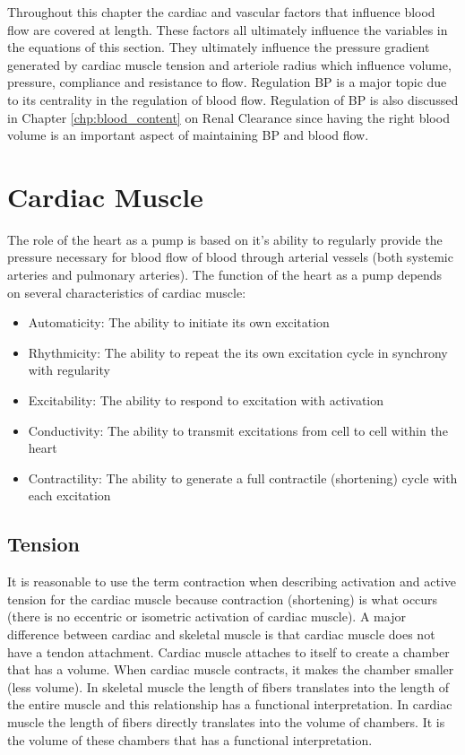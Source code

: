 Throughout this chapter the cardiac and vascular factors that influence blood flow are covered at length. These factors all ultimately influence the variables in the equations of this section. They ultimately influence the pressure gradient generated by cardiac muscle tension and arteriole radius which influence volume, pressure, compliance and resistance to flow. Regulation BP is a major topic due to its centrality in the regulation of blood flow. Regulation of BP is also discussed in Chapter \ref{chp:blood_content} on Renal Clearance since having the right blood volume is an important aspect of maintaining BP and blood flow.

\section{Cardiac Muscle}

The role of the heart as a pump is based on it's ability to regularly provide the pressure necessary for blood flow of blood through arterial vessels (both systemic arteries and pulmonary arteries). The function of the heart as a pump depends on several characteristics of cardiac muscle:

\begin{itemize}
    
    \item Automaticity: The ability to initiate its own excitation
    \item Rhythmicity: The ability to repeat the its own excitation cycle in synchrony with regularity
    \item Excitability: The ability to respond to excitation with activation
    \item Conductivity: The ability to transmit excitations from cell to cell within the heart
    \item Contractility: The ability to generate a full contractile (shortening) cycle with each excitation
 
\end{itemize}

\subsection{Tension}

It is reasonable to use the term contraction when describing activation and active tension for the cardiac muscle because contraction (shortening) is what occurs (there is no eccentric or isometric activation of cardiac muscle). A major difference between cardiac and skeletal muscle is that cardiac muscle does not have a tendon attachment. Cardiac muscle attaches to itself to create a chamber that has a volume. When cardiac muscle contracts, it makes the chamber smaller (less volume). In skeletal muscle the length of fibers translates into the length of the entire muscle and this relationship has a functional interpretation. In cardiac muscle the length of fibers directly translates into the volume of chambers. It is the volume of these chambers that has a functional interpretation. 

